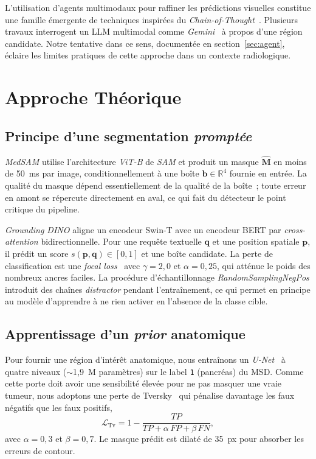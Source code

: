 \documentclass{article}
\begin{document}
L'utilisation d'agents multimodaux pour raffiner les pr\'edictions visuelles
constitue une famille \'emergente de techniques inspir\'ees du
\emph{Chain-of-Thought}~\cite{wei2022chainofthought}. Plusieurs travaux
interrogent un LLM multimodal comme \emph{Gemini}~\cite{team2024gemini} \`a
propos d'une r\'egion candidate. Notre tentative dans ce sens, document\'ee en
section~\ref{sec:agent}, \'eclaire les limites pratiques de cette approche dans
un contexte radiologique.

\section{Approche Th\'eorique}

\subsection{Principe d'une segmentation \emph{prompt\'ee}}

\emph{MedSAM} utilise l'architecture \emph{ViT-B} de \emph{SAM} et produit un
masque $\hat{\boldsymbol{M}}$ en moins de 50~ms par image, conditionnellement
\`a une bo\^ite $\boldsymbol{b}\in\mathbb{R}^4$ fournie en entr\'ee. La
qualit\'e du masque d\'epend essentiellement de la qualit\'e de la bo\^ite~;
toute erreur en amont se r\'epercute directement en aval, ce qui fait du
d\'etecteur le point critique du pipeline.

\emph{Grounding DINO} aligne un encodeur Swin-T avec un encodeur BERT par
\emph{cross-attention} bidirectionnelle. Pour une requ\^ete textuelle
$\boldsymbol{q}$ et une position spatiale $\boldsymbol{p}$, il pr\'edit un
score $s(\boldsymbol{p},\boldsymbol{q})\in[0,1]$ et une bo\^ite candidate.
La perte de classification est une \emph{focal loss}~\cite{lin2017focal} avec
$\gamma=2{,}0$ et $\alpha=0{,}25$, qui att\'enue le poids des nombreux ancres
faciles. La proc\'edure d'\'echantillonnage \emph{RandomSamplingNegPos}
introduit des cha\^ines \emph{distractor} pendant l'entra\^inement, ce qui
permet en principe au mod\`ele d'apprendre \`a ne rien activer en l'absence
de la classe cible.

\subsection{Apprentissage d'un \emph{prior} anatomique}

Pour fournir une r\'egion d'int\'er\^et anatomique, nous entra\^inons un
\emph{U-Net}~\cite{ronneberger2015unet} \`a quatre niveaux ($\sim$1{,}9~M
param\`etres) sur le label \texttt{1} (pancr\'eas) du MSD. Comme cette
porte doit avoir une sensibilit\'e \'elev\'ee pour ne pas masquer une vraie
tumeur, nous adoptons une perte de Tversky~\cite{salehi2017tversky} qui
p\'enalise davantage les faux n\'egatifs que les faux positifs,
\begin{equation}
\mathcal{L}_{\text{Tv}}=1-\frac{TP}{TP+\alpha\,FP+\beta\,FN},
\end{equation}
avec $\alpha=0{,}3$ et $\beta=0{,}7$. Le masque pr\'edit est dilat\'e de 35~px
pour absorber les erreurs de contour.
\end{document}

